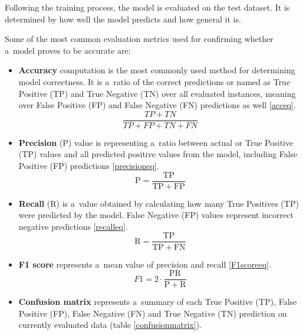     Following the training process, the model is evaluated on the test dataset. It is determined by how well the model predicts and how general it is. 

    Some of the most common evaluation metrics \cite{FAWCETT2006861} used for confirming whether a~model proves to be accurate are:
    \begin{itemize}
        \item \textbf{Accuracy} computation is the most commonly used method for determining model correctness. It is a~ratio of the correct predictions or named as True Positive (TP) and True Negative (TN) over all evaluated instances, meaning over False Positive (FP) and False Negative (FN) predictions as well \ref{acceq}. 
        \begin{equation}\label{acceq}
            \frac{TP+TN}{TP+FP+TN+FN}
        \end{equation}
         \newpage
        \item \textbf{Precision} (P) value is representing a~ratio between actual or True Positive (TP) values and all predicted positive values from the model, including False Positive (FP) predictions \ref{precisioneq}. 
        \begin{equation}\label{precisioneq}
            \mathrm{P}=\frac{\mathrm{TP}}{\mathrm{TP}+\mathrm{FP}}
        \end{equation}
        \item \textbf{Recall} (R) is a~value obtained by calculating how many True Positives (TP) were predicted by the model. False Negative (FP) values represent incorrect negative predictions \ref{recalleq}.
        \begin{equation}\label{recalleq}
            \mathrm{R}=\frac{\mathrm{TP}}{\mathrm{TP}+\mathrm{FN}}
        \end{equation}
        \item \textbf{F1 score} represents a~mean value of precision and recall \ref{F1scoreeq}. 
        \begin{equation}\label{F1scoreeq}
            F 1=2 \cdot \frac{\mathrm{PR}}{\mathrm{P}+\mathrm{R}}
        \end{equation}
        \item \textbf{Confusion matrix} represents a~summary of each True Positive (TP), False Positive (FP), False Negative (FN) and True Negative (TN) prediction on currently evaluated data (table \ref{confusionmatrix}). 
        \begin{table}[!h]
        \begin{center}

\end{center}
\end{table}
\end{itemize}

